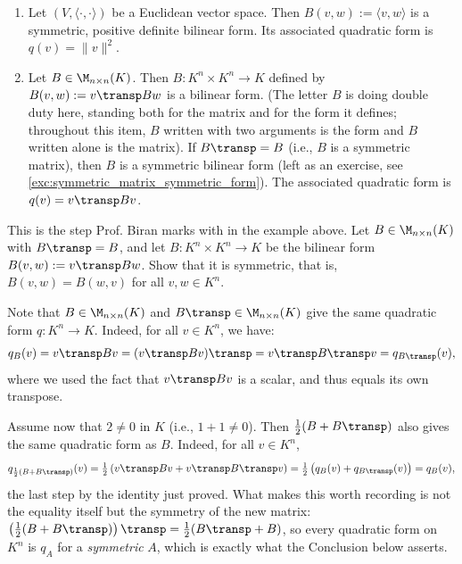 \begin{example}
\leavevmode
\begin{enumerate}
    \item Let $(V, \langle \cdot, \cdot \rangle)$ be a Euclidean vector space. Then $B(v, w) := \langle v, w \rangle$ is a symmetric, positive definite bilinear form. Its associated quadratic form is $q(v) = \|v\|^2$.
    \item Let $B \in \M_{n \times n}(K)$. Then $B \colon K^n \times K^n \to K$ defined by $B(v, w) := v\transp B w$ is a bilinear form. (The letter $B$ is doing double duty here, standing both for the matrix and for the form it defines; throughout this item, $B$ written with two arguments is the form and $B$ written alone is the matrix). If $B\transp = B$ (i.e., $B$ is a symmetric matrix), then $B$ is a symmetric bilinear form (left as an exercise, see \cref{exc:symmetric_matrix_symmetric_form}). The associated quadratic form is $q(v) = v\transp B v$.
\end{enumerate}
\end{example}

\begin{exercise}
\label{exc:symmetric_matrix_symmetric_form}
This is the step Prof. Biran marks with  in the example above. Let $B \in \M_{n \times n}(K)$ with $B\transp = B$, and let $B \colon K^n \times K^n \to K$ be the bilinear form $B(v, w) := v\transp B w$. Show that it is symmetric, that is, $B(v, w) = B(w, v)$ for all $v, w \in K^n$.
\end{exercise}

\begin{remark}
Note that $B \in \M_{n \times n}(K)$ and $B\transp \in \M_{n \times n}(K)$ give the same quadratic form $q \colon K^n \to K$. Indeed, for all $v \in K^n$, we have:
\[
q_B(v) = v\transp B v = (v\transp B v)\transp = v\transp B\transp v = q_{B\transp}(v),
\]
where we used the fact that $v\transp B v$ is a scalar, and thus equals its own transpose.

Assume now that $2 \neq 0$ in $K$ (i.e., $1 + 1 \neq 0$). Then $\frac{1}{2}(B + B\transp)$ also gives the same quadratic form as $B$.
Indeed, for all $v \in K^n$,
\[
q_{\frac{1}{2}(B + B\transp)}(v) = \tfrac{1}{2}\left( v\transp B v + v\transp B\transp v \right) = \tfrac{1}{2}\left( q_B(v) + q_{B\transp}(v) \right) = q_B(v),
\]
the last step by the identity just proved. What makes this worth recording is not the equality itself but the symmetry of the new matrix: $\left(\frac{1}{2}(B + B\transp)\right)\transp = \frac{1}{2}(B\transp + B)$, so every quadratic form on $K^n$ is $q_A$ for a \emph{symmetric} $A$, which is exactly what the Conclusion below asserts.
\end{remark}


